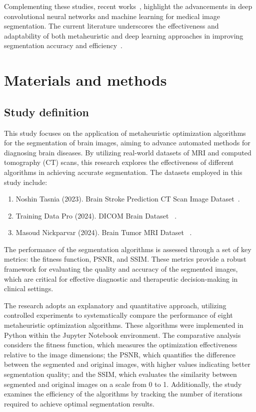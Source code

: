 \documentclass{elsarticle}
\begin{document}
Complementing these studies, recent works~\cite{Chakraborty2022, Elyan2022, An2020}, highlight the advancements in deep convolutional neural networks and machine learning for medical image segmentation. The current literature underscores the effectiveness and adaptability of both metaheuristic and deep learning approaches in improving segmentation accuracy and efficiency~\cite{jones2023automated}.

\section{Materials and methods}\label{sec:mm}

\subsection{Study definition}

This study focuses on the application of metaheuristic optimization algorithms for the segmentation of brain images, aiming to advance automated methods for diagnosing brain diseases. By utilizing real-world datasets of MRI and computed tomography (CT) scans, this research explores the effectiveness of different algorithms in achieving accurate segmentation. The datasets employed in this study include:

\begin{enumerate}
\item Noshin Tasnia (2023). Brain Stroke Prediction CT Scan Image Dataset~\cite{Tasnia2023}.
\item Training Data Pro (2024). DICOM Brain Dataset ~\cite{TrainingDataPro2024}.
\item Masoud Nickparvar (2024). Brain Tumor MRI Dataset ~\cite{Nickparvar2024}.
\end{enumerate}

The performance of the segmentation algorithms is assessed through a set of key metrics: the fitness function, PSNR, and SSIM. These metrics provide a robust framework for evaluating the quality and accuracy of the segmented images, which are critical for effective diagnostic and therapeutic decision-making in clinical settings.

The research adopts an explanatory and quantitative approach, utilizing controlled experiments to systematically compare the performance of eight metaheuristic optimization algorithms. These algorithms were implemented in Python within the Jupyter Notebook environment. The comparative analysis considers the fitness function, which measures the optimization effectiveness relative to the image dimensions; the PSNR, which quantifies the difference between the segmented and original images, with higher values indicating better segmentation quality; and the SSIM, which evaluates the similarity between segmented and original images on a scale from 0 to 1. Additionally, the study examines the efficiency of the algorithms by tracking the number of iterations required to achieve optimal segmentation results.
\end{document}
